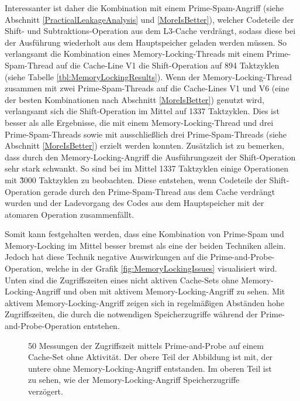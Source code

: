 Interessanter ist daher die Kombination mit einem Prime-Spam-Angriff (siehe Abschnitt \ref{PracticalLeakageAnalysis} und \ref{MoreIsBetter}), welcher Codeteile der Shift- und Subtraktions-Operation aus dem L3-Cache verdrängt, sodass diese bei der Ausführung wiederholt aus dem Hauptspeicher geladen werden müssen.
So verlangsamt die Kombination eines Memory-Locking-Threads mit einem Prime-Spam-Thread auf die Cache-Line V1 die Shift-Operation auf 894 Taktzyklen (siehe Tabelle \ref{tbl:MemoryLockingResults}).
Wenn der Memory-Locking-Thread zusammen mit zwei Prime-Spam-Threads auf die Cache-Lines V1 und V6 (eine der besten Kombinationen nach Abschnitt \ref{MoreIsBetter}) genutzt wird, verlangsamt sich die Shift-Operation im Mittel auf 1337 Taktzyklen.
Dies ist besser als alle Ergebnisse, die mit einem Memory-Locking-Thread und drei Prime-Spam-Threads sowie mit ausschließlich drei Prime-Spam-Threads (siehe Abschnitt \ref{MoreIsBetter}) erzielt werden konnten.
Zusätzlich ist zu bemerken, dass durch den Memory-Locking-Angriff die Ausführungszeit der Shift-Operation sehr stark schwankt.
So sind bei im Mittel 1337 Taktzyklen einige Operationen mit \~3000 Taktzyklen zu beobachten.
Diese entstehen, wenn Codeteile der Shift-Operation gerade durch den Prime-Spam-Thread aus dem Cache verdrängt wurden und der Ladevorgang des Codes aus dem Hauptspeicher mit der atomaren Operation zusammenfällt.

Somit kann festgehalten werden, dass eine Kombination von Prime-Spam und Memory-Locking im Mittel besser bremst als eine der beiden Techniken allein.
Jedoch hat diese Technik negative Auswirkungen auf die Prime-and-Probe-Operation, welche in der Grafik \ref{fig:MemoryLockingIssues} visualisiert wird.
Unten sind die Zugriffszeiten eines nicht aktiven Cache-Sets ohne Memory-Locking-Angriff und oben mit aktivem Memory-Locking-Angriff zu sehen.
Mit aktivem Memory-Locking-Angriff zeigen sich in regelmäßigen Abständen hohe Zugriffszeiten, die durch die notwendigen Speicherzugriffe während der Prime-and-Probe-Operation entstehen.

\label{fig:MemoryLockingIssues}
\begin{figure}[h]
\centering
\begin{scaletikzpicturetowidth}{\textwidth}

\end{scaletikzpicturetowidth}
\caption{50 Messungen der Zugriffszeit mittels Prime-and-Probe auf einem Cache-Set ohne Aktivität. Der obere Teil der Abbildung ist mit, der untere ohne Memory-Locking-Angriff entstanden. Im oberen Teil ist zu sehen, wie der Memory-Locking-Angriff Speicherzugriffe verzögert.}
\end{figure}

